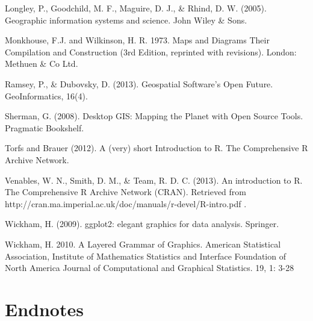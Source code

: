 \documentclass[]{article}
\begin{document}
Longley, P., Goodchild, M. F., Maguire, D. J., \& Rhind, D. W. (2005).
Geographic information systems and science. John Wiley \& Sons.

Monkhouse, F.J. and Wilkinson, H. R. 1973. Maps and Diagrams Their
Compilation and Construction (3rd Edition, reprinted with revisions).
London: Methuen \& Co Ltd.

Ramsey, P., \& Dubovsky, D. (2013). Geospatial Software's Open Future.
GeoInformatics, 16(4).

Sherman, G. (2008). Desktop GIS: Mapping the Planet with Open Source
Tools. Pragmatic Bookshelf.

Torfs and Brauer (2012). A (very) short Introduction to R. The
Comprehensive R Archive Network.

Venables, W. N., Smith, D. M., \& Team, R. D. C. (2013). An introduction
to R. The Comprehensive R Archive Network (CRAN). Retrieved from
http://cran.ma.imperial.ac.uk/doc/manuals/r-devel/R-intro.pdf .

Wickham, H. (2009). ggplot2: elegant graphics for data analysis.
Springer.

Wickham, H. 2010. A Layered Grammar of Graphics. American Statistical
Association, Institute of Mathematics Statistics and Interface
Foundation of North America Journal of Computational and Graphical
Statistics. 19, 1: 3-28

\section{Endnotes}
\end{document}
